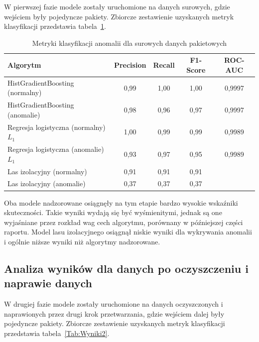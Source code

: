 \documentclass[12pt,twoside]{article}
\begin{document}
W pierwszej fazie modele zostały uruchomione na danych surowych, gdzie wejściem były pojedyncze pakiety. 
Zbiorcze zestawienie uzyskanych metryk klasyfikacji przedstawia tabela~\ref{Tab:WynikiSurowe}.

\begin{table}[ht]
\caption{Metryki klasyfikacji anomalii dla surowych danych pakietowych}
\centering		
	\begin{tabular}{|l|c|c|c|c|}	
		\hline
		Algorytm & Precision & Recall & F1-Score & ROC-AUC \\
		\hline
		HistGradientBoosting (normalny) & 0,99 & 1,00 & 1,00 & 0,9997 \\
		HistGradientBoosting (anomalie) & 0,98 & 0,96 & 0,97 & 0,9997 \\
		Regresja logistyczna (normalny) $L_1$ & 1,00 & 0,99 & 0,99 & 0,9989 \\
		Regresja logistyczna (anomalie) $L_1$ & 0,93 & 0,97 & 0,95 & 0,9989 \\
		Las izolacyjny (normalny) & 0,91 & 0,91 & 0,91 &  \\
		Las izolacyjny (anomalie) & 0,37 & 0,37 & 0,37 & \\
		\hline
	\end{tabular}	
\label{Tab:WynikiSurowe}
\end{table}

Oba modele nadzorowane osiągnęły na tym etapie bardzo wysokie wskaźniki skuteczności. 
Takie wyniki wydają się być wyśmienitymi, jednak są one wyjaśniane przez rozkład wag cech algorytmu, porównany w późniejszej części raportu.
Model lasu izolacyjnego osiągnął niskie wyniki dla wykrywania anomalii i ogólnie niższe wyniki niż algorytmy nadzorowane.

\subsection{Analiza wyników dla danych po oczyszczeniu i naprawie danych}

W drugiej fazie modele zostały uruchomione na danych oczyszczonych i naprawionych przez drugi krok przetwarzania, gdzie wejściem dalej były pojedyncze pakiety. 
Zbiorcze zestawienie uzyskanych metryk klasyfikacji przedstawia tabela~\ref{Tab:Wyniki2}.
\end{document}
